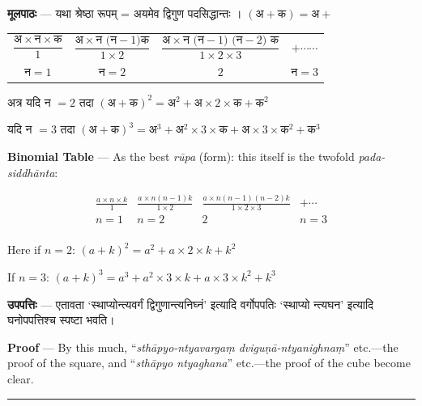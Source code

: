 \documentclass[11pt,a4paper]{article}
\newcommand{\skt}[1]{{\devanagarifont\color{sktcolor} #1}}
\newenvironment{bilingual}{%
  \par\noindent
  \begin{minipage}[t]{0.47\textwidth}%
}{%
  \par\end{minipage}%
}
\newcommand{\rightcol}{%
  \par\end{minipage}%
  \hfill
  \begin{minipage}[t]{0.47\textwidth}%
}
\begin{document}
\medskip

\begin{bilingual}
\textbf{मूलपाठः} --- \skt{यथा श्रेष्ठा रूपम् = अयमेव द्विगुण पदसिद्धान्तः} । $(\text{अ} + \text{क}) = \text{अ} +$

\begin{tabular}{c|c|c|c}
$\dfrac{\text{अ} \times \text{न} \times \text{क}}{1}$ & $\dfrac{\text{अ} \times \text{न (न}-1)\text{क}}{1 \times 2}$ & $\dfrac{\text{अ} \times \text{न (न}-1)\text{ (न}-2)\text{ क}}{1 \times 2 \times 3}$ & $+ \cdots\cdots$ \\
$\text{न} = 1$ & $\text{न} = 2$ & $2$ & $\text{न} = 3$ \\  
\end{tabular}

\skt{अत्र यदि न} $= 2$ \skt{तदा} $(\text{अ} + \text{क})^2 = \text{अ}^2 + \text{अ} \times 2 \times \text{क} + \text{क}^2$

\skt{यदि न} $= 3$ \skt{तदा} $(\text{अ} + \text{क})^3 = \text{अ}^3 + \text{अ}^2 \times 3 \times \text{क} + \text{अ} \times 3 \times \text{क}^2 + \text{क}^3$
\rightcol
\textbf{Binomial Table} --- As the best \textit{rūpa} (form): this itself is the twofold \textit{pada-siddhānta}:

\[
\begin{array}{c|c|c|c}
\frac{a \times n \times k}{1} & \frac{a \times n(n-1)k}{1 \times 2} & \frac{a \times n(n-1)(n-2)k}{1 \times 2 \times 3} & + \cdots \\ \hline
n = 1 & n = 2 & 2 & n = 3 \\
\end{array}
\]

Here if $n = 2$: $(a + k)^2 = a^2 + a \times 2 \times k + k^2$

If $n = 3$: $(a + k)^3 = a^3 + a^2 \times 3 \times k + a \times 3 \times k^2 + k^3$
\end{bilingual}

\medskip

\begin{bilingual}
\textbf{उपपत्तिः} --- \skt{एतावता `स्थाप्योन्त्यवर्गं द्विगुणान्त्यनिघ्नं' इत्यादि वर्गोपपतिः `स्थाप्यो न्त्यघन' इत्यादि घनोपपत्तिश्च स्पष्टा भवति}।
\rightcol
\textbf{Proof} --- By this much, ``\textit{sthāpyo-ntyavargaṃ dviguṇā-ntyanighnaṃ}'' etc.---the proof of the square, and ``\textit{sthāpyo ntyaghana}'' etc.---the proof of the cube become clear.
\end{bilingual}

\medskip
\noindent\rule{\textwidth}{0.4pt}
\end{document}
